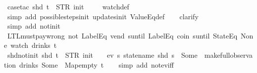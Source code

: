 \begin{isabellebody}
\ {\isacharparenleft}case{\isacharunderscore}tac\ {\isachardoublequoteopen}shd\ t\ {\isacharequal}\ {\isacharparenleft}STR\ {\isacharprime}{\isacharprime}init{\isacharprime}{\isacharprime}{\isacharcomma}\ {\isacharbrackleft}{\isacharbrackright}{\isacharparenright}{\isachardoublequoteclose}{\isacharparenright}\isanewline
\ \ \isamarkupfalse%
\ watch{\isacharunderscore}def\isanewline
\ \ \ \isamarkupfalse%
\ {\isacharparenleft}simp\ add{\isacharcolon}\ possible{\isacharunderscore}steps{\isacharunderscore}init\ updates{\isacharunderscore}init\ ValueEq{\isacharunderscore}def{\isacharparenright}\isanewline
\ \ \isamarkupfalse%
\ clarify\isanewline
\ \ \isamarkupfalse%
\ {\isacharparenleft}simp\ add{\isacharcolon}\ not{\isacharunderscore}init{\isacharparenright}%
\endisatagproof
{\isafoldproof}%
%
\isadelimproof
%
\endisadelimproof
\isanewline
\isanewline
\isanewline
{}\isamarkupfalse%
\ LTL{\isacharunderscore}must{\isacharunderscore}pay{\isacharunderscore}wrong{\isacharcolon}\ {\isachardoublequoteopen}{\isacharparenleft}{\isacharparenleft}not\ {\isacharparenleft}LabelEq\ {\isacharprime}{\isacharprime}vend{\isacharprime}{\isacharprime}\ suntil\ LabelEq\ {\isacharprime}{\isacharprime}coin{\isacharprime}{\isacharprime}{\isacharparenright}{\isacharparenright}\ suntil\ StateEq\ None{\isacharparenright}\ {\isacharparenleft}watch\ drinks\ t{\isacharparenright}{\isachardoublequoteclose}\isanewline
%
\isadelimproof
\ \ %
\endisadelimproof
%
\isatagproof
{}\isamarkupfalse%
%
\endisatagproof
{\isafoldproof}%
%
\isadelimproof
\isanewline
%
\endisadelimproof
\isanewline
{}\isamarkupfalse%
\ shd{\isacharunderscore}not{\isacharunderscore}init{\isacharcolon}\ {\isachardoublequoteopen}shd\ t\ {\isasymnoteq}\ {\isacharparenleft}STR\ {\isacharprime}{\isacharprime}init{\isacharprime}{\isacharprime}{\isacharcomma}\ {\isacharbrackleft}{\isacharbrackright}{\isacharparenright}\ {\isasymLongrightarrow}\ {\isasymnot}\ ev\ {\isacharparenleft}{\isasymlambda}s{\isachardot}\ statename\ {\isacharparenleft}shd\ s{\isacharparenright}\ {\isacharequal}\ Some\ {}{\isacharparenright}\ {\isacharparenleft}make{\isacharunderscore}full{\isacharunderscore}observation\ drinks\ {\isacharparenleft}Some\ {}{\isacharparenright}\ Map{\isachardot}empty\ t{\isacharparenright}{\isachardoublequoteclose}\isanewline
%
\isadelimproof
\ \ %
\endisadelimproof
%
\isatagproof
{}\isamarkupfalse%
\ {\isacharparenleft}simp\ add{\isacharcolon}\ not{\isacharunderscore}ev{\isacharunderscore}iff{\isacharparenright}\isanewline

\end{isabellebody}
